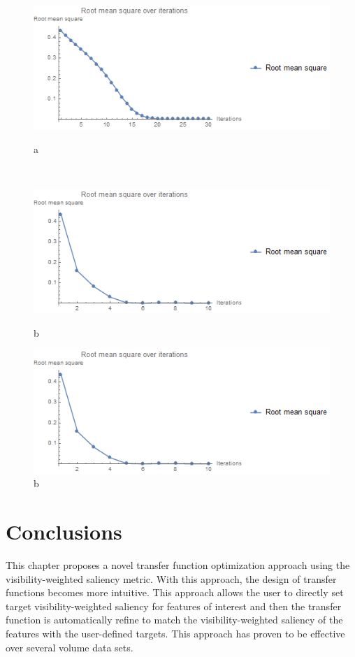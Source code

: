 \begin{figure}
	\centering
	\begin{minipage}{.3\textwidth}
		\includegraphics[width=1\linewidth]{images/rms_fixed}
		\caption{a}	
	\end{minipage}~
	\begin{minipage}{.3\textwidth}
		\includegraphics[width=1\linewidth]{images/rms_linesearch}
		\caption{b}	
	\end{minipage}
	\begin{minipage}{.3\textwidth}
		\includegraphics[width=1\linewidth]{images/rms_parallelsearch}
		\caption{b}	
	\end{minipage}
	\label{fig:nucleon_rms}
\end{figure}

\section{Conclusions}
This chapter proposes a novel transfer function optimization approach using the visibility-weighted saliency metric.
With this approach, the design of transfer functions becomes more intuitive. This approach allows the user to directly set target visibility-weighted saliency for features of interest and then the transfer function is automatically refine to match the visibility-weighted saliency of the features with the user-defined targets.
This approach has proven to be effective over several volume data sets.
